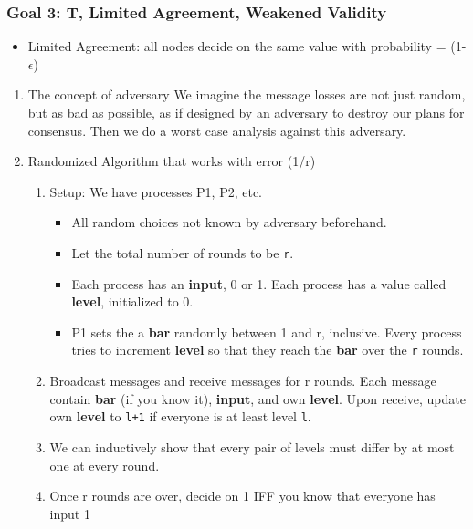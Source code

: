 \documentclass[11pt]{article}
\begin{document}
\subsubsection{Goal 3: T, Limited Agreement, Weakened Validity}
\label{sec:org3463446}
\begin{itemize}
  \item Limited Agreement: all nodes decide on the same value with probability =
        (1-\(\epsilon\))
\end{itemize}
\begin{enumerate}
  \item The concept of adversary
        \label{sec:orgcd0d58d}
        We imagine the message losses are not just random, but as bad as possible, as if
        designed by an adversary to destroy our plans for consensus. Then we do a worst
        case analysis against this adversary.
  \item Randomized Algorithm that works with error (1/r)
        \label{sec:org9350328}
        \begin{enumerate}
          \item Setup: We have processes P1, P2, etc.
                \begin{itemize}
                  \item All random choices not known by adversary beforehand.
                  \item Let the total number of rounds to be \texttt{r}.
                  \item Each process has an \textbf{input}, 0 or 1. Each process has a value called
                        \textbf{level}, initialized to 0.
                  \item P1 sets the a \textbf{bar} randomly between 1 and r, inclusive. Every process
                        tries to increment \textbf{level} so that they reach the \textbf{bar} over the \texttt{r}
                        rounds.
                \end{itemize}
          \item Broadcast messages and receive messages for r rounds. Each message contain
                \textbf{bar} (if you know it), \textbf{input}, and own \textbf{level}. Upon receive, update own
                \textbf{level} to \texttt{l+1} if everyone is at least level \texttt{l}.
          \item We can inductively show that every pair of levels must differ by at most one
                at every round.
          \item Once r rounds are over, decide on 1 IFF you know that everyone has input 1

\end{enumerate}
\end{enumerate}
\end{document}
